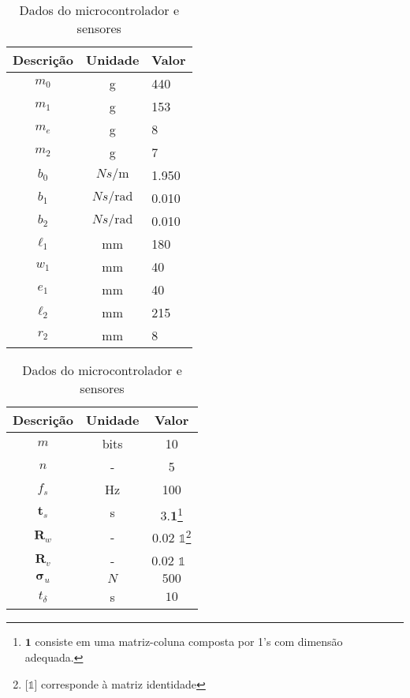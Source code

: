 \documentclass[a4paper, twoside]{article}
\begin{document}
    \begin{table}[!ht]
        \begin{minipage}[b]{0.45\linewidth}\centering
                \begin{tabular}{|c|c|l|}
                    \hline Descrição & Unidade & Valor\\ \hline
                    $m_0$ & g & 440\\
                    $m_1$ & g & 153\\
                    $m_e$ & g & 8\\
                    $m_2$ & g & 7\\
                    $b_0$   & ${N s}/{\mathrm{m}}$ & 1.950\\
                    $b_1$   & ${N s}/{\mathrm{rad}}$ & 0.010\\
                    $b_2$   & ${N s}/{\mathrm{rad}}$ & 0.010\\
                    $\ell_1$ & mm & 180\\ 
                    $w_1$ & mm & 40\\
                    $e_1$ & mm & 40\\
                    $\ell_2$ & mm  & 215\\
                    $r_2$ & mm & 8\\ 
                    \hline
                \end{tabular}
                \caption{Dados da planta}
                \label{tab:dados_planta}
        \end{minipage}
        \hspace{0.5cm}
        \begin{minipage}[b]{0.45\linewidth}
        \centering
                \begin{tabular}{|c|c|c|}
                    \hline Descrição & Unidade & Valor\\ \hline
                    $m$ & bits & 10 \\
                    $n$ & - & 5 \\
                    $f_s$ & Hz & 100 \\
                    $\mathbf{t}_s$ & s & $3.\mathbf{1}$\footnote{$\mathbf{1} $ consiste em uma matriz-coluna composta por 1's com dimensão adequada.} \\
                    $\mathbf{R}_w$ & - & 0.02 $\mathds{1}$\footnote{[$\mathds{1}$] corresponde à matriz identidade}  \\ 
                    $\mathbf{R}_v$ & - & 0.02 $\mathds{1}$ \, \\
                    $\mathbf{\sigma}_u$ & $N$ & $500$ \\
                    $t_{\delta}$ & s & $10$ \\
                    \hline
                \end{tabular}
                \caption{Dados do microcontrolador e sensores}
                \label{tab:dados_controle}
        \end{minipage}
    \end{table}

    \clearpage
    \printbibliography
\end{document}
